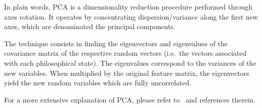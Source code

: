 \documentclass[%
 aip,
 jmp,%
 amsmath,amssymb,
 reprint,%
]{revtex4-1}
\begin{document}
In plain words, PCA is a dimensionality reduction procedure performed
through axes rotation.  It operates by concentrating
dispersion/variance along the first new axes, which are denominated
the principal components.

The technique consists in finding the eigenvectors and eigenvalues of
the covariance matrix of the respective random vectors (i.e.\ the
vectors associated with each philosophical state). The eigenvalues
correspond to the variances of the new variables.  When multiplied by
the original feature matrix, the eigenvectors yield the new random
variables which are fully uncorrelated.

For a more extensive explanation of PCA, please refer to~\cite{Costa}
and references therein.

\nocite{*}
\end{document}
